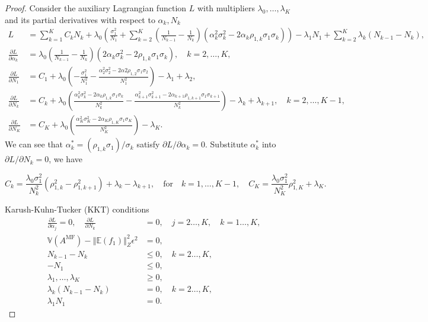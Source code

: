 \documentclass[final,3p,times,11pt]{elsarticle}
\begin{document}
\begin{proof}
Consider the auxiliary Lagrangian function $L$ with multipliers $\lambda_0,\ldots, \lambda_K$
and its partial derivatives with respect to $\alpha_k,N_k$
\begin{align*}
    L &= \sum_{k=1}^K C_kN_k +\lambda_0 \left(\frac{\sigma_1^2}{N_1} + \sum_{k=2}^K \left(\frac{1}{N_{k-1}} - \frac{1}{N_k}\right)\left(\alpha_k^2\sigma_k^2 - 2\alpha_k\rho_{1,k}\sigma_1\sigma_k\right)\right)-\lambda_1 N_1+\sum_{k=2}^K\lambda_k(N_{k-1} - N_k),\\
    \frac{\partial L}{\partial \alpha_k}&=\lambda_0\left(\frac{1}{N_{k-1}} - \frac{1}{N_k}\right)\left(2\alpha_k\sigma_k^2 - 2\rho_{1,k}\sigma_1\sigma_k\right),\quad k=2,\dots,K,\\
    \frac{\partial L}{\partial N_1}&=C_1 + \lambda_0\left(-\frac{\sigma_1^2}{N_1^2} - \frac{\alpha_2^2\sigma_2^2-2\alpha2\rho_{1,2}\sigma_1\sigma_2}{N_1^2}\right)-\lambda_1+\lambda_2,\\
    \frac{\partial L}{\partial N_k}&=C_k+\lambda_0\left(\frac{\alpha_k^2\sigma_k^2 - 2\alpha_k\rho_{1,k}\sigma_1\sigma_k}{N_k^2}-\frac{\alpha_{k+1}^2\sigma_{k+1}^2 - 2\alpha_{k+1}\rho_{1,k+1}\sigma_1\sigma_{k+1}}{N_k^2}\right)-\lambda_k+\lambda_{k+1}, \quad k=2,\dots,K-1,\\
    \frac{\partial L}{\partial N_K}&=C_K + \lambda_0\left(\frac{\alpha_K^2\sigma_K^2 - 2\alpha_K\rho_{1,K}\sigma_1\sigma_K}{N_K^2}\right)-\lambda_K.
\end{align*}
We can see that $\alpha_k^*=(\rho_{1,k}\sigma_1)/\sigma_k$ satisfy $\partial L/\partial \alpha_k=0$. Substitute $\alpha_k^*$ into $\partial L/\partial N_k=0$, we have

\begin{equation*}
    C_k=\frac{\lambda_0\sigma_1^2}{N_k^2}\left(\rho_{1,k}^2-\rho_{1,k+1}^2\right)+\lambda_k-\lambda_{k+1},\quad \text{for} \quad k=1,\ldots,K-1,\quad C_K=\frac{\lambda_0\sigma_1^2}{N_K^2}\rho_{1,K}^2+\lambda_K.
\end{equation*}

Karush-Kuhn-Tucker (KKT) conditions
\begin{align*}
\frac{\partial L}{\partial \alpha_j}=0,\quad \frac{\partial L}{\partial N_k}&=0,\quad j=2\ldots,K, \quad k=1\ldots,K,\\
\mathbb{V}\left(A^{\text{MF}}\right)- \left\Vert\mathbb{E}(f_1) \right\Vert_{Z}^2\epsilon^2 &= 0,\\
    N_{k-1}-N_k&\le 0, \quad k=2\ldots,K,\\
    -N_1&\le 0,\\[6pt]
    \lambda_1,\ldots,\lambda_K &\ge 0,\\
    \lambda_k(N_{k-1}-N_k)&=0,\quad k=2\ldots,K,\\
    \lambda_1 N_1&=0.
\end{align*}


\end{proof}
\end{document}
